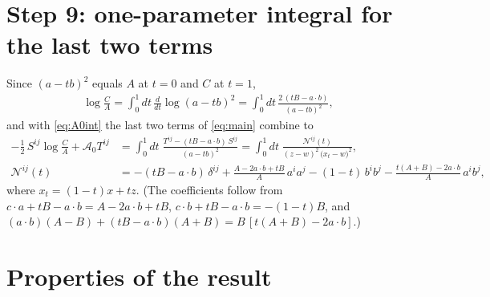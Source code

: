 \documentclass[10pt]{article}
\numberwithin{equation}{section}
\begin{document}
\section{Step 9: one-parameter integral for the last two terms}

Since $(a-tb)^{2}$ equals $A$ at $t=0$ and $C$ at $t=1$,
\begin{align}
\log\frac{C}{A}=\int_{0}^{1}dt\,\frac{d}{dt}\log(a-tb)^{2}=\int_{0}^{1}dt\,\frac{2\,(tB-a\cdot b)}{(a-tb)^{2}},
\end{align}
and with \eqref{eq:A0int} the last two terms of \eqref{eq:main} combine to
\begin{align}
-\frac12\,S^{ij}\log\frac{C}{A}+\mathcal{A}_{0}T^{ij}&=\int_{0}^{1}dt\;\frac{T^{ij}-(tB-a\cdot b)\,S^{ij}}{(a-tb)^{2}}
=\int_{0}^{1}dt\;\frac{\mathcal{N}^{ij}(t)}{(z-w)^{2}\,\big(x_{t}-w\big)^{2}}, \label{eq:irep}\\
\mathcal{N}^{ij}(t)&=-(tB-a\cdot b)\,\delta^{ij}+\frac{A-2a\cdot b+tB}{A}\,a^{i}a^{j}-(1-t)\,b^{i}b^{j}-\frac{t(A+B)-2a\cdot b}{A}\,a^{i}b^{j},
\end{align}
where $x_{t}=(1-t)x+tz$. (The coefficients follow from $c\cdot a+tB-a\cdot b=A-2a\cdot b+tB$, $c\cdot b+tB-a\cdot b=-(1-t)B$, and $(a\cdot b)(A-B)+(tB-a\cdot b)(A+B)=B\,[t(A+B)-2a\cdot b]$.)

\section{Properties of the result}
\end{document}
